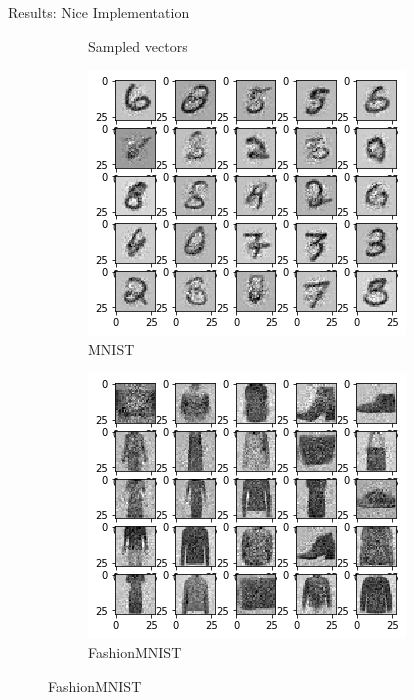 \begin{frame}{Results: Nice Implementation}
\begin{figure}[htbp!]
\begin{subfigure}[b]{0.3\textwidth}
         \caption{Sampled vectors}
     \end{subfigure} 
     \hfill
     \begin{subfigure}[b]{0.3\textwidth}
         \centering
         \includegraphics[width=\textwidth]{Images/mnist2.png}
         \caption{MNIST}
     \end{subfigure}
     \hfill
     \begin{subfigure}[b]{0.3\textwidth}
         \centering
         \includegraphics[width=\textwidth]{Images/fashion2.png}
         \caption{FashionMNIST}
     \end{subfigure}
\end{figure}
\end{frame}

